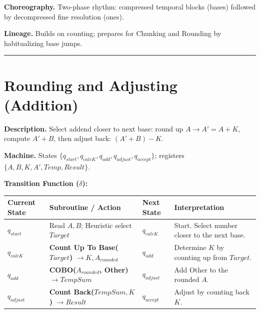 \documentclass[12pt]{book}
\begin{document}
\textbf{Choreography.} Two-phase rhythm: compressed temporal blocks
(bases) followed by decompressed fine resolution (ones).

\textbf{Lineage.} Builds on counting; prepares for Chunking and Rounding
by habitualizing base jumps.

\begin{center}\rule{0.5\linewidth}{0.5pt}\end{center}

\section{Rounding and Adjusting
(Addition)}\label{rounding-and-adjusting-addition}

\textbf{Description.} Select addend closer to next base: round up
\(A \to A' = A + K\), compute \(A' + B\), then adjust back:
\((A' + B) - K\).

\textbf{Machine.} States
\(\{q_{start}, q_{calcK}, q_{add}, q_{adjust}, q_{accept}\}\); registers
\(\{A,B,K,A',Temp,Result\}\).

\textbf{Transition Function (\(\delta\)):}

\begin{longtable}[]{@{}
  >{\raggedright\arraybackslash}p{}
  >{\raggedright\arraybackslash}p{}
  >{\raggedright\arraybackslash}p{}
  >{\raggedright\arraybackslash}p{}@{}}
\toprule\noalign{}
\begin{minipage}[b]{\linewidth}\raggedright
Current State
\end{minipage} & \begin{minipage}[b]{\linewidth}\raggedright
Subroutine / Action
\end{minipage} & \begin{minipage}[b]{\linewidth}\raggedright
Next State
\end{minipage} & \begin{minipage}[b]{\linewidth}\raggedright
Interpretation
\end{minipage} \\
\midrule\noalign{}
\endhead
\bottomrule\noalign{}
\endlastfoot
\(q_{start}\) & Read \(A, B\); Heuristic select \(Target\) &
\(q_{calcK}\) & Start. Select number closer to the next base. \\
\(q_{calcK}\) & \textbf{Count Up To Base(\(Target\))}
\(\to K, A_{rounded}\) & \(q_{add}\) & Determine \(K\) by counting up
from \(Target\). \\
\(q_{add}\) & \textbf{COBO(\(A_{rounded}\), Other)} \(\to TempSum\) &
\(q_{adjust}\) & Add Other to the rounded \(A\). \\
\(q_{adjust}\) & \textbf{Count Back(\(TempSum, K\))} \(\to Result\) &
\(q_{accept}\) & Adjust by counting back \(K\). \\
\end{longtable}
\end{document}

